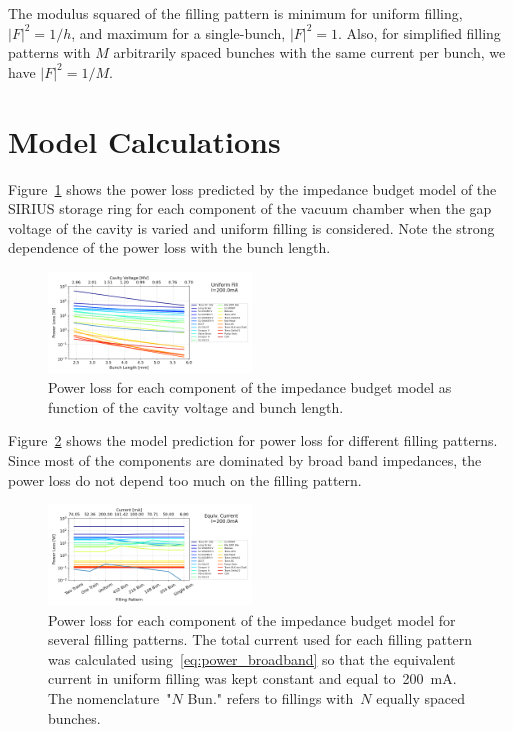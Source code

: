 \documentclass[a4paper,
               biblatex,     %
               ]{jacow}
\begin{document}
    The modulus squared of the filling pattern is minimum for uniform filling, $|F|^2=1/h$, and maximum for a single-bunch, $|F|^2=1$. Also, for simplified filling patterns with $M$ arbitrarily spaced bunches with the same current per bunch, we have $|F|^2=1/M$.

\section{Model Calculations}

Figure~\ref{fig:model_vary_vgap} shows the power loss predicted by the impedance budget model of the SIRIUS storage ring for each component of the vacuum chamber when the gap voltage of the cavity is varied and uniform filling is considered. Note the strong dependence of the power loss with the bunch length.
\begin{figure}
    \centering
    \includegraphics[width=0.48\textwidth]{vary_vgap_uniform_fill_curr200p00mA.png}
    \caption{Power loss for each component of the impedance budget model as function of the cavity voltage and bunch length.}
    \label{fig:model_vary_vgap}
\end{figure}
Figure~\ref{fig:model_vary_fillp} shows the model prediction for power loss for different filling patterns. Since most of the components are dominated by broad band impedances, the power loss do not depend too much on the filling pattern.
\begin{figure}
    \centering
    \includegraphics[width=0.48\textwidth]{vary_fillp_equivcurr200p00mA.png}
    \caption{Power loss for each component of the impedance budget model for several filling patterns. The total current used for each filling pattern was calculated using~\eqref{eq:power_broadband} so that the equivalent current in uniform filling was kept constant and equal to~\SI{200}{\milli\ampere}. The nomenclature~"$\!N$ Bun." refers to fillings with~$N$ equally spaced bunches.}
    \label{fig:model_vary_fillp}
\end{figure}
\end{document}
